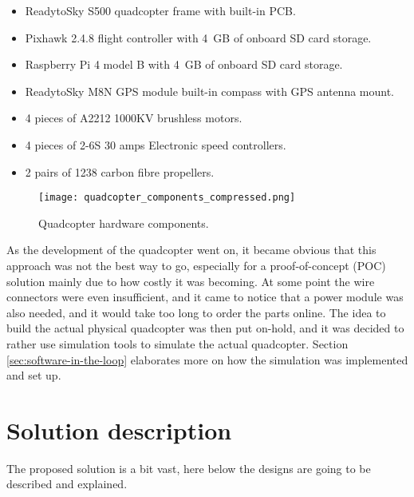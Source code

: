 \begin{itemize}
    \item ReadytoSky S500 quadcopter frame with built-in PCB.
    \item Pixhawk 2.4.8 flight controller with 4 GB of onboard SD card storage.
    \item Raspberry Pi 4 model B with 4 GB of onboard SD card storage.
    \item ReadytoSky M8N GPS module built-in compass with GPS antenna mount.
    \item 4 pieces of A2212 1000KV brushless motors.
    \item 4 pieces of 2-6S 30 amps Electronic speed controllers.
    \item 2 pairs of 1238 carbon fibre propellers.
\end{itemize}

\begin{figure}[H]
    \centering \texttt{[image: quadcopter\_components\_compressed.png]}
    \caption{Quadcopter hardware components.}
    \label{fig:quadcopter-hardware-components}
\end{figure}

As the development of the quadcopter went on, it became obvious that this approach was not the best way to go, especially for a proof-of-concept (POC) solution mainly due to how costly it was becoming. At some point the wire connectors were even insufficient, and it came to notice that a power module was also needed, and it would take too long to order the parts online. The idea to build the actual physical quadcopter was then put on-hold, and it was decided to rather use simulation tools to simulate the actual quadcopter. Section \ref{sec:software-in-the-loop} elaborates more on how the simulation was implemented and set up.




\section{Solution description}
\label{solution-description}

The proposed solution is a bit vast, here below the designs are going to be described and explained.



